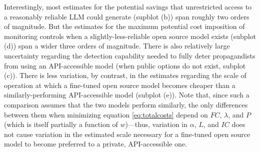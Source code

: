 \documentclass{article}
\begin{document}
Interestingly, most estimates for the potential savings that unrestricted access to a reasonably reliable LLM could generate (supblot (b)) span roughly two orders of magnitude. But the estimates for the maximum potential cost imposition of monitoring controls when a slightly-less-reliable open source model exists (subplot (d)) span a wider three orders of magnitude. There is also relatively large uncertainty regarding the detection capability needed to fully deter propagandists from using an API-accessible model (when public options do not exist, subplot (c)). There is less variation, by contrast, in the estimates regarding the scale of operation at which a fine-tuned open source model becomes cheaper than a similarly-performing API-accessible model (subplot (e)). Note that, since such a comparison assumes that the two models perform similarly, the only differences between them when minimizing equation \ref{eq:totalcosts} depend on $FC$, $\lambda$, and $P$ (which is itself partially a function of $w$)—thus, variation in $\alpha$, $L$, and $IC$ does not cause variation in the estimated scale necessary for a fine-tuned open source model to become preferred to a private, API-accessible one.
\end{document}
